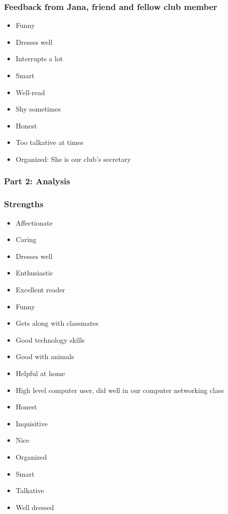 \subsubsection*{Feedback from Jana, friend and fellow club member}
\begin{itemize}[leftmargin=1.0cm]
	\item Funny
	\item Dresses well
	\item Interrupts a lot
	\item Smart
	\item Well-read
	\item Shy sometimes
	\item Honest
	\item Too talkative at times
	\item Organized: She is our club's secretary
\end{itemize}
\subsubsection*{Part 2: Analysis}
\subsubsection*{Strengths}
\begin{itemize}[leftmargin=1.0cm]
	\item Affectionate
	\item Caring
	\item Dresses well
	\item Enthusiastic
	\item Excellent reader
	\item Funny
	\item Gets along with classmates
	\item Good technology skills
	\item Good with animals
	\item Helpful at home
	\item High level computer user, did well in our computer networking class
	\item Honest
	\item Inquisitive
	\item Nice
	\item Organized
	\item Smart
	\item Talkative
	\item Well dressed
\end{itemize}
